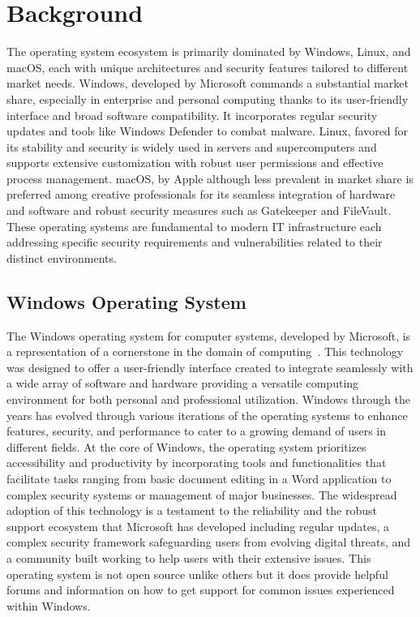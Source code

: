 \documentclass[manuscript,acmsmall,anonymous,review,screen,nonacm=true, authorversion=true]{acmart}
\begin{document}
\section{Background}
The operating system ecosystem is primarily dominated by Windows, Linux, and macOS, each with unique architectures and security features tailored to different market needs. Windows, developed by Microsoft commands a substantial market share, especially in enterprise and personal computing thanks to its user-friendly interface and broad software compatibility. It incorporates regular security updates and tools like Windows Defender to combat malware. Linux, favored for its stability and security is widely used in servers and supercomputers and supports extensive customization with robust user permissions and effective process management. macOS, by Apple although less prevalent in market share is preferred among creative professionals for its seamless integration of hardware and software and robust security measures such as Gatekeeper and FileVault. These operating systems are fundamental to modern IT infrastructure each addressing specific security requirements and vulnerabilities related to their distinct environments.

\subsection{Windows Operating System}
The Windows operating system for computer systems, developed by Microsoft, is a
representation of a cornerstone in the domain of computing~\cite{gcfglobal,Webopedia}. This technology was designed
to offer a user-friendly interface created to integrate seamlessly with a wide array of software
and hardware providing a versatile computing environment for both personal and professional
utilization. Windows through the years has evolved through various iterations of the
operating systems to enhance features, security, and performance to cater to a growing demand
of users in different fields. At the core of Windows, the operating system prioritizes
accessibility and productivity by incorporating tools and functionalities that facilitate tasks
ranging from basic document editing in a Word application to complex security systems or
management of major businesses. The widespread adoption of this technology is a
testament to the reliability and the robust support ecosystem that Microsoft has developed
including regular updates, a complex security framework safeguarding users from evolving
digital threats, and a community built working to help users with their extensive issues.
This operating system is not open source unlike others but it does provide helpful forums and
information on how to get support for common issues experienced within Windows.
\end{document}
